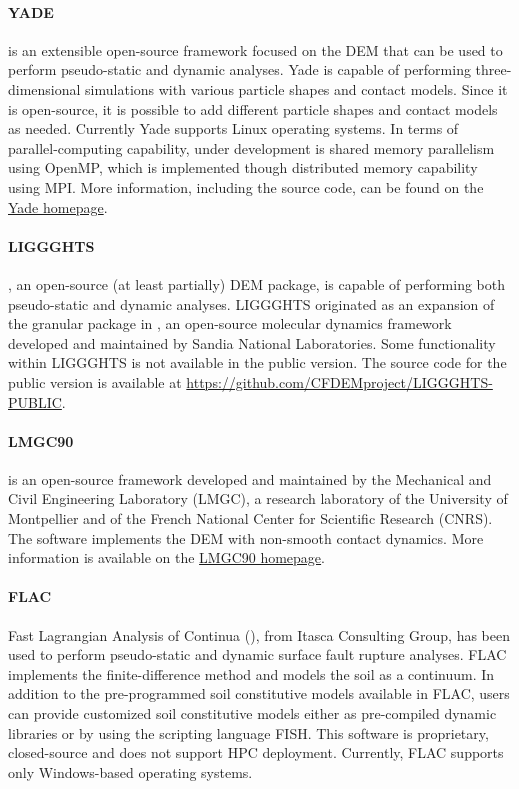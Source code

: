 \paragraph{YADE}
 is an extensible open-source framework focused on the DEM \citep{yade2005doc} that can be used to perform pseudo-static and dynamic analyses. Yade is capable of performing three-dimensional simulations with various particle shapes and contact models. Since it is open-source, it is possible to add different particle shapes and contact models as needed. Currently Yade supports Linux operating systems. In terms of parallel-computing capability, under development is shared memory parallelism using OpenMP, which is implemented though distributed memory capability using MPI. More information, including the source code, can be found on the \href{https://yade-dem.org/doc/}{Yade homepage}.

\paragraph{LIGGGHTS}
, an open-source (at least partially) DEM package, is capable of performing both pseudo-static and dynamic analyses. LIGGGHTS originated as an expansion of the granular package in , an open-source molecular dynamics framework developed and maintained by Sandia National Laboratories. Some functionality within LIGGGHTS is not available in the public version. The source code for the public version is available at \url{https://github.com/CFDEMproject/LIGGGHTS-PUBLIC}.

\paragraph{LMGC90}
 is an open-source framework developed and maintained by the Mechanical and Civil Engineering Laboratory (LMGC), a research laboratory of the University of Montpellier and of the French National Center for Scientific Research (CNRS). The software implements the DEM with non-smooth contact dynamics. More information is available on the \href{http://mimetics-engineering.fr/index.php/en/lmgc90-2/}{LMGC90 homepage}.

\paragraph{FLAC}
Fast Lagrangian Analysis of Continua (), from Itasca Consulting Group, has been used to perform pseudo-static and dynamic surface fault rupture analyses. FLAC implements the finite-difference method and models the soil as a continuum. In addition to the pre-programmed soil constitutive models available in FLAC, users can provide customized soil constitutive models either as pre-compiled dynamic libraries or by using the scripting language FISH. This software is proprietary, closed-source and does not support HPC deployment. Currently, FLAC supports only Windows-based operating systems.

